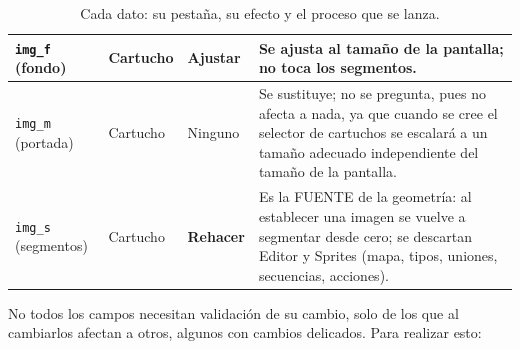 \begin{table}[H]
\begin{tabular}{|p{3.1cm}|p{2.2cm}|p{2.6cm}|p{6.4cm}|}
		\texttt{img\_f} (fondo) & Cartucho & \textbf{Ajustar} & Se ajusta al tamaño de la pantalla; no toca los segmentos. \\ \hline
		\texttt{img\_m} (portada) & Cartucho & Ninguno & Se sustituye; no se pregunta, pues no afecta a nada, ya que cuando se cree el selector de cartuchos se escalará a un tamaño adecuado independiente del tamaño de la pantalla. \\ \hline
		\texttt{img\_s} (segmentos) & Cartucho & \textbf{Rehacer} & Es la FUENTE de la geometría: al establecer una imagen se vuelve a segmentar desde cero; se descartan Editor y Sprites (mapa, tipos, uniones, secuencias, acciones). \\ \hline
	\end{tabular}
	\caption{Cada dato: su pestaña, su efecto y el proceso que se lanza.}
	\label{tab:F5I21Datos}
\end{table}

No todos los campos necesitan validación de su cambio, solo de los que al cambiarlos afectan a otros, algunos con cambios delicados. Para realizar esto:

